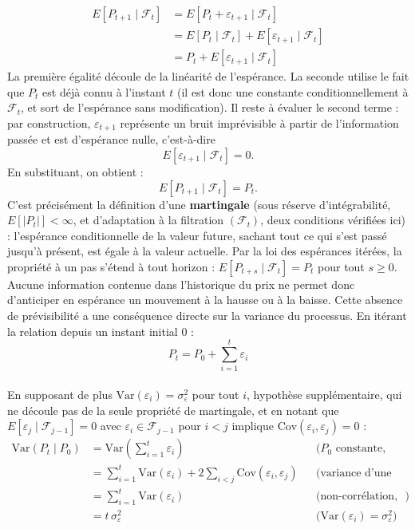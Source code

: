 \documentclass{article}
\begin{document}
\begin{align}
E[P_{t+1} \mid \mathcal{F}_t] &= E[P_t + \varepsilon_{t+1} \mid \mathcal{F}_t] \\
&= E[P_t \mid \mathcal{F}_t] + E[\varepsilon_{t+1} \mid \mathcal{F}_t] \\
&= P_t + E[\varepsilon_{t+1} \mid \mathcal{F}_t]
\end{align}
La première égalité découle de la linéarité de l'espérance. La seconde utilise le fait que $P_t$ est déjà connu à l'instant $t$ (il est donc une constante conditionnellement à $\mathcal{F}_t$, et sort de l'espérance sans modification). Il reste à évaluer le second terme : par construction, $\varepsilon_{t+1}$ représente un bruit imprévisible à partir de l'information passée et est d'espérance nulle, c'est-à-dire
\begin{equation}
E[\varepsilon_{t+1} \mid \mathcal{F}_t] = 0.
\end{equation}
En substituant, on obtient :
\begin{equation}
E[P_{t+1} \mid \mathcal{F}_t] = P_t.
\end{equation}
C'est précisément la définition d'une \textbf{martingale} (sous réserve d'intégrabilité, $E[|P_t|]<\infty$, et d'adaptation à la filtration $(\mathcal{F}_t)$, deux conditions vérifiées ici) : l'espérance conditionnelle de la valeur future, sachant tout ce qui s'est passé jusqu'à présent, est égale à la valeur actuelle. Par la loi des espérances itérées, la propriété à un pas s'étend à tout horizon : $E[P_{t+s}\mid\mathcal{F}_t]=P_t$ pour tout $s\geq 0$. Aucune information contenue dans l'historique du prix ne permet donc d'anticiper en espérance un mouvement à la hausse ou à la baisse. 
Cette absence de prévisibilité a une conséquence directe sur la variance du processus. En itérant la relation depuis un instant initial $0$ :
\begin{equation}
P_t = P_0 + \sum_{i=1}^{t} \varepsilon_i
\end{equation}\\
En supposant de plus $\text{Var}(\varepsilon_i)=\sigma_\varepsilon^2$ pour tout $i$, hypothèse supplémentaire, qui ne découle pas de la seule propriété de martingale, et en notant que $E[\varepsilon_j\mid\mathcal{F}_{j-1}]=0$ avec $\varepsilon_i\in\mathcal{F}_{j-1}$ pour $i<j$ implique $\text{Cov}(\varepsilon_i,\varepsilon_j)=0$ :  \\
\begin{align}
\text{Var}(P_t \mid P_0)&= \text{Var}\left(\sum_{i=1}^{t} \varepsilon_i\right)
&& \text{($P_0$ constante, n'affecte pas la variance)} \\
&= \sum_{i=1}^{t} \text{Var}(\varepsilon_i) + 2\sum_{i<j} \text{Cov}(\varepsilon_i, \varepsilon_j)
&& \text{(variance d'une somme)} \\
&= \sum_{i=1}^{t} \text{Var}(\varepsilon_i)
&& \text{(non-corrélation, établie ci-dessus}) \\
&= t \, \sigma_\varepsilon^2
&& \text{(} \text{Var}(\varepsilon_i) = \sigma_\varepsilon^2 \text{)}
\end{align}
\end{document}
